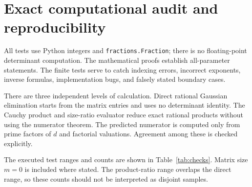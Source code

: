 \documentclass[11pt,a4paper]{article}
\theoremstyle{definition}
\theoremstyle{remark}
\begin{document}
\section{Exact computational audit and reproducibility}
\label{sec:verification}

All tests use Python integers and \texttt{fractions.Fraction}; there is no
floating-point determinant computation. The mathematical proofs establish
all-parameter statements. The finite tests serve to catch indexing errors,
incorrect exponents, inverse formulas, implementation bugs, and falsely
stated boundary cases.

There are three independent levels of calculation. Direct rational Gaussian
elimination starts from the matrix entries and uses no determinant identity.
The Cauchy product and size-ratio evaluator reduce exact rational products
without using the numerator theorem. The predicted numerator is computed
only from prime factors of $d$ and factorial valuations. Agreement among
these is checked explicitly.

The executed test ranges and counts are shown in
Table~\ref{tab:checks}. Matrix size $m=0$ is included where stated. The
product-ratio range overlaps the direct range, so these counts should not
be interpreted as disjoint samples.
\end{document}
